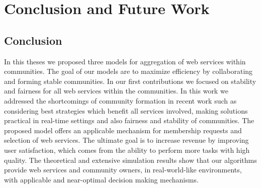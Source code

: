 \chapter{Conclusion and Future Work}\label{Chap5:Conclusion}

\section{Conclusion}

In this theses we proposed three models for aggregation of web services within communities. The goal of our models are to maximize efficiency by collaborating and forming stable communities. In our first contributions we focused on stability and fairness for all web services within the communities. In this work we addressed the shortcomings of community formation in recent work such as considering best strategies which benefit all services involved, making solutions practical in real-time settings and also fairness and stability of communities. The proposed model offers an applicable mechanism for membership requests and selection of web services. The ultimate goal is to increase revenue by improving user satisfaction, which comes from the ability to perform more tasks with high quality. The theoretical and extensive simulation results show that our algorithms provide web services and community owners, in real-world-like environments, with applicable and near-optimal decision making mechanisms.

